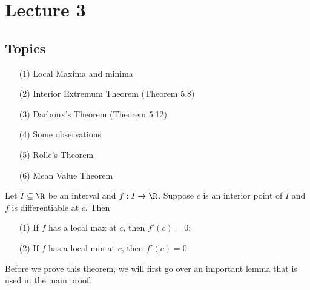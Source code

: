 \section{Lecture 3}

\subsection{Topics}

\begin{enumerate}
    \item[(1)] Local Maxima and minima
    \item[(2)] Interior Extremum Theorem (Theorem 5.8)
    \item[(3)] Darboux's Theorem (Theorem 5.12)
    \item[(4)] Some observations
    \item[(5)] Rolle's Theorem
    \item[(6)] Mean Value Theorem
\end{enumerate}

\begin{theorem}\label{Theorem 5.8}
    Let \( I \subseteq  \R   \) be an interval and \( f : I \to \R  \). Suppose \( c  \) is an interior point of \( I  \) and \( f  \) is differentiable at \( c  \). Then
    \begin{enumerate}
        \item[(1)] If \( f  \) has a local max at \( c  \), then \( f'(c)  = 0 \);
        \item[(2)] If \( f  \) has a local min at \( c  \), then \( f'(c) = 0  \).
    \end{enumerate}
\end{theorem}

Before we prove this theorem, we will first go over an important lemma that is used in the main proof. 

